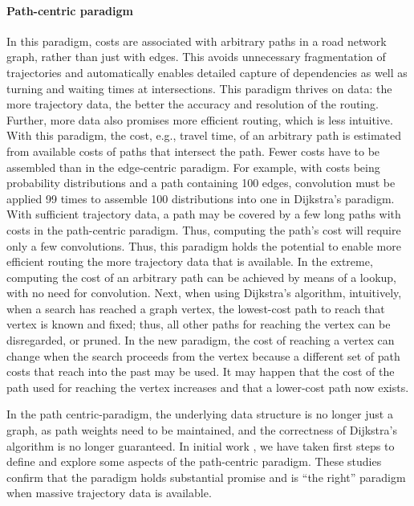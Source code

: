 \documentclass[11pt]{article}
\begin{document}
\paragraph{Path-centric paradigm} In this paradigm, costs are associated with arbitrary paths in a road network graph, rather than just with edges. This avoids unnecessary fragmentation of trajectories and automatically enables detailed capture of dependencies as well as turning and waiting times at intersections. This paradigm thrives on data: the more trajectory data, the better the accuracy and resolution of the routing. Further, more data also promises more efficient routing, which is less intuitive. With this paradigm, the cost, e.g., travel time, of an arbitrary path is estimated from available costs of paths that intersect the path. Fewer costs have to be assembled than in the edge-centric paradigm. For example, with costs being probability distributions and a path containing 100 edges, convolution must be applied 99 times to assemble 100 distributions into one in Dijkstra's paradigm. With sufficient trajectory data, a path may be covered by a few long paths with costs in the path-centric paradigm. Thus, computing the path's cost will require only a few convolutions. Thus, this paradigm holds the potential to enable more efficient routing the more trajectory data that is available. In the extreme, computing the cost of an arbitrary path can be achieved by means of a lookup, with no need for convolution. Next, when using Dijkstra's algorithm, intuitively, when a search has reached a graph vertex, the lowest-cost path to reach that vertex is known and fixed; thus, all other paths for reaching the vertex can be disregarded, or pruned. In the new paradigm, the cost of reaching a vertex can change when the search proceeds from the vertex because a different set of path costs that reach into the past may be used. It may happen that the cost of the path used for reaching the vertex increases and that a lower-cost path now exists.

In the path centric-paradigm, the underlying data structure is no longer just a graph, as path weights need to be maintained, and the correctness of Dijkstra's algorithm is no longer guaranteed. In initial work \cite{5,6}, we have taken first steps to define and explore some aspects of the path-centric paradigm. These studies confirm that the paradigm holds substantial promise and is ``the right'' paradigm when massive trajectory data is available.
\end{document}
